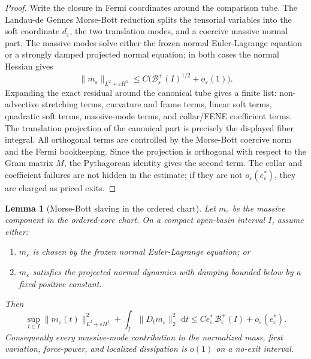 \documentclass[11pt]{article}
\newtheorem{lemma}[theorem]{Lemma}
\theoremstyle{definition}
\newcommand{\dd}{\,\mathrm d}
\newcommand{\eps}{\varepsilon}
\newcommand{\estar}{e_\varepsilon^\ast}
\newcommand{\Basin}{\mathcal B}
\begin{document}
\begin{proof}
Write the closure in Fermi coordinates around the comparison tube.  The
Landau-de Gennes Morse-Bott reduction splits the tensorial variables into the
soft coordinate \(d_\eps\), the two translation modes, and a coercive massive
normal part.  The massive modes solve either the frozen normal Euler-Lagrange
equation or a strongly damped projected normal equation; in both cases the
normal Hessian gives
\[
        \|m_\eps\|_{L^2+\eps H^1}
        \le
        C\bigl(
        \Basin_\eps^+(I)^{1/2}
        +o_\eps(1)\bigr).
\]
Expanding the exact residual around the canonical tube gives a finite list:
non-advective stretching terms, curvature and frame terms, linear soft terms,
quadratic soft terms, massive-mode terms, and collar/FENE coefficient terms.
The translation projection of the canonical part is precisely the displayed
fiber integral.  All orthogonal terms are controlled by the Morse-Bott
coercive norm and the Fermi bookkeeping.  Since the projection is orthogonal
with respect to the Gram matrix \(M\), the Pythagorean identity gives the
second term.  The collar and coefficient failures are not hidden in the
estimate; if they are not \(o_\eps(\estar)\), they are charged as priced exits.
\end{proof}

\begin{lemma}[Morse-Bott slaving in the ordered chart]
\label{lem:short-mb-slaving}
Let \(m_\eps\) be the massive component in the ordered-core chart.  On a compact
open-basin interval \(I\), assume either:
\begin{enumerate}[label=(\alph*)]
\item \(m_\eps\) is chosen by the frozen normal Euler-Lagrange equation; or
\item \(m_\eps\) satisfies the projected normal dynamics with damping bounded
below by a fixed positive constant.
\end{enumerate}
Then
\[
        \sup_{t\in I}
        \|m_\eps(t)\|_{L^2+\eps H^1}^2
        +
        \int_I\|D_t m_\eps\|_2^2\,\dd t
        \le
        C\estar\,\Basin_\eps^+(I)+o_\eps(\estar).
\]
Consequently every massive-mode contribution to the normalized mass,
first variation, force-power, and localized dissipation is \(o(1)\) on a
no-exit interval.
\end{lemma}
\end{document}
